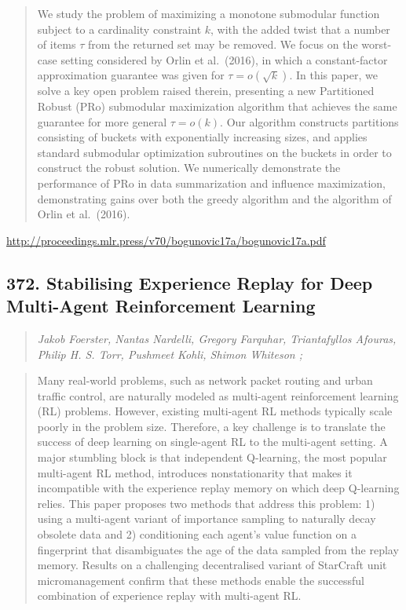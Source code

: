 \documentclass{article}
\begin{document}
\begin{quote}
    We study the problem of maximizing a monotone submodular function subject to a cardinality constraint $k$, with the added twist that a number of items $\tau$ from the returned set may be removed. We focus on the worst-case setting considered by Orlin et al.\ (2016), in which a constant-factor approximation guarantee was given for $\tau = o(\sqrt{k})$. In this paper, we solve a key open problem raised therein, presenting a new Partitioned Robust (PRo) submodular maximization algorithm that achieves the same guarantee for more general $\tau = o(k)$. Our algorithm constructs partitions consisting of buckets with exponentially increasing sizes, and applies standard submodular optimization subroutines on the buckets in order to construct the robust solution. We numerically demonstrate the performance of PRo in data summarization and influence maximization, demonstrating gains over both the greedy algorithm and the algorithm of Orlin et al.\ (2016).  
\end{quote}

\href{http://proceedings.mlr.press/v70/bogunovic17a/bogunovic17a.pdf}{http://proceedings.mlr.press/v70/bogunovic17a/bogunovic17a.pdf}

\subsection{372. Stabilising Experience Replay for Deep Multi-Agent Reinforcement Learning}

\begin{quote}
\footnotesize{\textit{Jakob Foerster, Nantas Nardelli, Gregory Farquhar, Triantafyllos Afouras, Philip H. S. Torr, Pushmeet Kohli, Shimon Whiteson ;}}

\end{quote}

\begin{quote}
    Many real-world problems, such as network packet routing and urban traffic control, are naturally modeled as multi-agent reinforcement learning (RL) problems. However, existing multi-agent RL methods typically scale poorly in the problem size. Therefore, a key challenge is to translate the success of deep learning on single-agent RL to the multi-agent setting. A major stumbling block is that independent Q-learning, the most popular multi-agent RL method, introduces nonstationarity that makes it incompatible with the experience replay memory on which deep Q-learning relies. This paper proposes two methods that address this problem: 1) using a multi-agent variant of importance sampling to naturally decay obsolete data and 2) conditioning each agent’s value function on a fingerprint that disambiguates the age of the data sampled from the replay memory. Results on a challenging decentralised variant of StarCraft unit micromanagement confirm that these methods enable the successful combination of experience replay with multi-agent RL.  
\end{quote}
\end{document}
